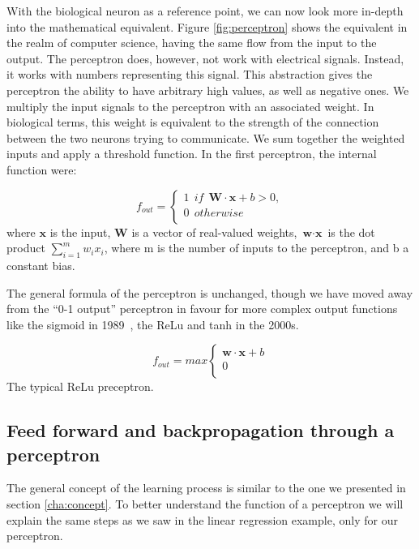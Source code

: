 With the biological neuron as a reference point, we can now look more in-depth into the mathematical equivalent. 
Figure \ref{fig:perceptron} shows the equivalent in the realm of computer science, having the same flow from the input to the output. 
The perceptron does, however, not work with electrical signals. Instead, it works with numbers representing this signal. This abstraction gives the perceptron the ability to have arbitrary high values, as well as negative ones. 
We multiply the input signals to the perceptron with an associated weight. In biological terms, this weight is equivalent to the strength of the connection between the two neurons trying to communicate. We sum together the weighted inputs and apply a threshold function. In the first perceptron, the internal function were:


\begin{equation}
    \label{eq:tresh}
 f_{out}=   \left\{
\begin{array}{ll}
		1 \ \ if \ \ \textbf{W} \cdot \textbf{x} + b > 0, \\
     	0 \ \ otherwise \\
\end{array} 
\right. 
\end{equation}
where $\textbf{x}$ is the input, $\textbf{W}$ is a vector of real-valued weights, $\textbf{w} \cdot \textbf{x}$ is the dot product $\sum _{i=1}^{m}w_{i}x_{i}$, where m is the number of inputs to the perceptron, and b a constant bias. 


The general formula of the perceptron is unchanged, though we have moved away from the ``0-1 output'' perceptron in favour for more complex output functions like the sigmoid in 1989~\cite{Funahashi:1989:ARC:71287.71290}, the ReLu and tanh in the 2000s. 

\begin{equation}
    \label{eq:ReLu}
 f_{out}=   max\left\{
\begin{array}{ll}
		\textbf{w} \cdot \textbf{x} + b \\
     	0 \\
\end{array} 
\right. 
\end{equation}
The typical ReLu preceptron.



\subsection{Feed forward and backpropagation through a perceptron}
The general concept of the learning process is similar to the one we presented in section \ref{cha:concept}. To better understand the function of a perceptron we will explain the same steps as we saw in the linear regression example, only for our perceptron.

